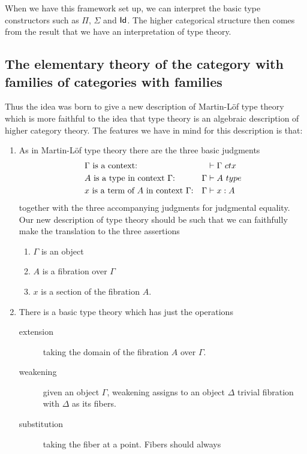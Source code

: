 When we have this framework set up, we can interpret the basic type constructors
such as $\Pi$, $\Sigma$ and $\mathsf{Id}_{}$.
The higher categorical structure then comes from the
result that we have an interpretation of type theory.

\subsection{The elementary theory of the category with families of categories
with families}

Thus the idea was born to give a new description of Martin-L\"of type theory
which is more faithful to the idea that type theory is an algebraic description
of higher category theory. The features we have in mind for this description
is that:
\begin{enumerate}
\item As in Martin-L\"of type theory there are the three basic judgments
      \begin{align*}
        & \Gamma\text{ is a context:} & \jctx*{\Gamma}\\
        & A\text{ is a type in context }\Gamma\text{:} & \jtype*{\Gamma}{A}\\
        & x\text{ is a term of $A$ in context }\Gamma\text{:} & \jterm*{\Gamma}{A}{x}
      \end{align*}
      together with the three accompanying judgments for judgmental equality.
      Our new description of type theory should be such that we can faithfully
      make the translation to the three assertions
      \begin{enumerate}
      \item $\Gamma$ is an object\\
      \item $A$ is a fibration over $\Gamma$\\
      \item $x$ is a section of the fibration $A$. 
      \end{enumerate}
\item There is a basic type theory which has just the operations
      \begin{description}
      \item[extension] taking the domain of the fibration $A$ over $\Gamma$.
      \item[weakening] given an object $\Gamma$, weakening assigns to an object
      $\Delta$ trivial fibration with $\Delta$ as its fibers.
      \item[substitution] taking the fiber at a point. Fibers should always

\end{description}
\end{enumerate}

